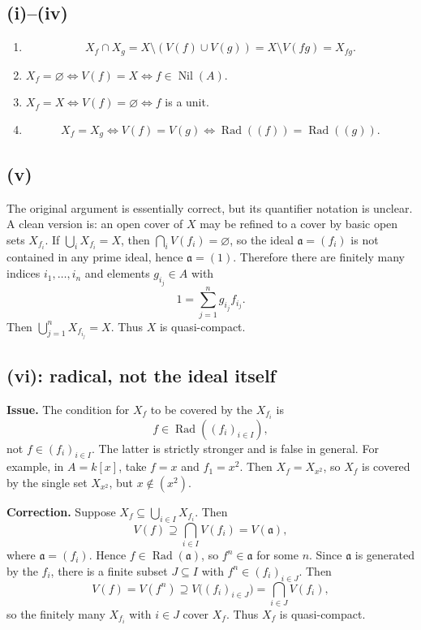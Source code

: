 \documentclass[11pt]{article}
\DeclareMathOperator{\Rad}{Rad}
\DeclareMathOperator{\Nil}{Nil}
\newcommand{\fa}{\mathfrak a}
\begin{document}
\subsection*{(i)--(iv)}
\begin{enumerate}[label=(\roman*)]
  \item
        \[
        X_f\cap X_g
        =X\setminus(V(f)\cup V(g))
        =X\setminus V(fg)
        =X_{fg}.
        \]
  \item \(X_f=\varnothing\iff V(f)=X\iff f\in\Nil(A)\).
  \item \(X_f=X\iff V(f)=\varnothing\iff f\) is a unit.
  \item
        \[
        X_f=X_g\iff V(f)=V(g)
        \iff\Rad((f))=\Rad((g)).
        \]
\end{enumerate}

\subsection*{(v)}
The original argument is essentially correct, but its quantifier notation
is unclear.  A clean version is: an open cover of \(X\) may be refined to a
cover by basic open sets \(X_{f_i}\).  If \(\bigcup_iX_{f_i}=X\), then
\(\bigcap_iV(f_i)=\varnothing\), so the ideal \(\fa=(f_i)\) is not contained
in any prime ideal, hence \(\fa=(1)\).  Therefore there are finitely many
indices \(i_1,\ldots,i_n\) and elements \(g_{i_j}\in A\) with
\[
1=\sum_{j=1}^ng_{i_j}f_{i_j}.
\]
Then \(\bigcup_{j=1}^nX_{f_{i_j}}=X\).  Thus \(X\) is quasi-compact.

\subsection*{(vi): radical, not the ideal itself}

\textbf{Issue.}  The condition for \(X_f\) to be covered by the \(X_{f_i}\) is
\[
f\in\Rad((f_i)_{i\in I}),
\]
not \(f\in(f_i)_{i\in I}\).  The latter is strictly stronger and is false in
general.  For example, in \(A=k[x]\), take \(f=x\) and \(f_1=x^2\).  Then
\(X_f=X_{x^2}\), so \(X_f\) is covered by the single set \(X_{x^2}\), but
\(x\notin(x^2)\).

\textbf{Correction.}  Suppose \(X_f\subseteq\bigcup_{i\in I}X_{f_i}\).  Then
\[
V(f)\supseteq\bigcap_{i\in I}V(f_i)=V(\fa),
\]
where \(\fa=(f_i)\).  Hence \(f\in\Rad(\fa)\), so \(f^n\in\fa\) for some
\(n\).  Since \(\fa\) is generated by the \(f_i\), there is a finite subset
\(J\subseteq I\) with \(f^n\in(f_i)_{i\in J}\).  Then
\[
V(f)=V(f^n)\supseteq V\bigl((f_i)_{i\in J}\bigr)
=\bigcap_{i\in J}V(f_i),
\]
so the finitely many \(X_{f_i}\) with \(i\in J\) cover \(X_f\).  Thus \(X_f\)
is quasi-compact.
\end{document}
